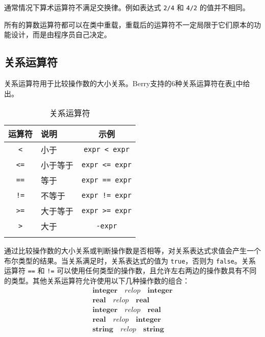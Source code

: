 通常情况下算术运算符不满足交换律。例如表达式 \texttt{2/4} 和 \texttt{4/2} 的值并不相同。

所有的算数运算符都可以在类中重载，重载后的运算符不一定局限于它们原本的功能设计，而是由程序员自己决定。

\subsection{关系运算符}

关系运算符用于比较操作数的大小关系。Berry支持的6种关系运算符在表\ref{tab::relop_operator}中给出。

\begin{table}[htb]
    \centering
    \setlength{\tabcolsep}{10mm}
    \begin{tabular}{clc} \Xhline{1pt}
        \textbf{运算符} & \textbf{说明} & \textbf{示例} \\ \hline
        \texttt{<} & 小于 & \texttt{expr < expr} \\
        \texttt{<=} & 小于等于 & \texttt{expr <= expr} \\
        \texttt{==} & 等于 & \texttt{expr == expr} \\
        \texttt{!=} & 不等于 & \texttt{expr != expr} \\
        \texttt{>=} & 大于等于 & \texttt{expr >= expr} \\
        \texttt{>} & 大于 & \texttt{-expr} \\
        \Xhline{1pt}
    \end{tabular}
    \caption{关系运算符}
    \label{tab::relop_operator}
\end{table}

通过比较操作数的大小关系或判断操作数是否相等，对关系表达式求值会产生一个布尔类型的结果。当关系满足时，关系表达式的值为 \texttt{true}，否则为 \texttt{false}。关系运算符 \texttt{==} 和 \texttt{!=} 可以使用任何类型的操作数，且允许左右两边的操作数具有不同的类型。其他关系运算符允许使用以下几种操作数的组合：\vspace{-0.5em}
\begin{gather*}
    \bm{integer} \quad relop \quad \bm{integer} \\
    \bm{real} \quad relop \quad \bm{real} \\
    \bm{integer} \quad relop \quad \bm{real} \\
    \bm{real} \quad relop \quad \bm{integer} \\
    \bm{string} \quad relop \quad \bm{string}
\end{gather*}

